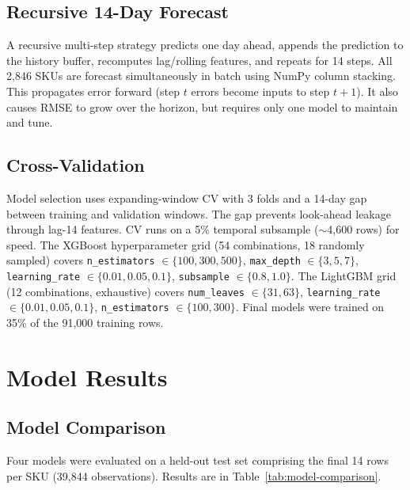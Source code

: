 \documentclass[11pt,letterpaper]{article}
\begin{document}
\subsection{Recursive 14-Day Forecast}

A recursive multi-step strategy predicts one day ahead, appends the prediction to the history buffer, recomputes lag/rolling features, and repeats for 14 steps. All 2,846 SKUs are forecast simultaneously in batch using NumPy column stacking. This propagates error forward (step $t$ errors become inputs to step $t{+}1$). It also causes RMSE to grow over the horizon, but requires only one model to maintain and tune.

\subsection{Cross-Validation}

Model selection uses expanding-window CV with 3 folds and a 14-day gap between training and validation windows. The gap prevents look-ahead leakage through lag-14 features. CV runs on a 5\% temporal subsample ($\sim$4,600 rows) for speed. The XGBoost hyperparameter grid (54 combinations, 18 randomly sampled) covers \texttt{n\_estimators} $\in \{100, 300, 500\}$, \texttt{max\_depth} $\in \{3, 5, 7\}$, \texttt{learning\_rate} $\in \{0.01, 0.05, 0.1\}$, \texttt{subsample} $\in \{0.8, 1.0\}$. The LightGBM grid (12 combinations, exhaustive) covers \texttt{num\_leaves} $\in \{31, 63\}$, \texttt{learning\_rate} $\in \{0.01, 0.05, 0.1\}$, \texttt{n\_estimators} $\in \{100, 300\}$. Final models were trained on 35\% of the 91,000 training rows.


\section{Model Results}
\label{sec:results}

\subsection{Model Comparison}

Four models were evaluated on a held-out test set comprising the final 14 rows per SKU (39,844 observations). Results are in Table~\ref{tab:model-comparison}.
\end{document}
